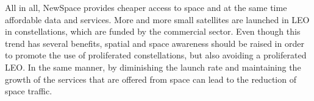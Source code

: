\normalsize

All in all, NewSpace provides cheaper access to space and at the same time affordable data and services. More and more small satellites are launched in LEO in constellations, which are funded by the commercial sector. Even though this trend has several benefits, spatial and space awareness should be raised in order to promote the use of proliferated constellations, but also avoiding a proliferated LEO. \cite{pLEO} In the same manner, by diminishing the launch rate and maintaining the growth of the services that are offered from space can lead to the reduction of space traffic. %



